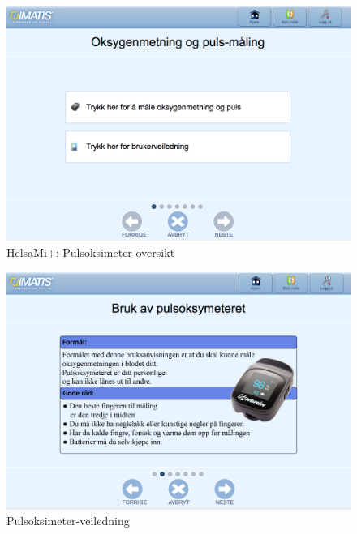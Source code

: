 \begin{figure}
\includegraphics[width=1.0\textwidth,center]{fig/helsami/pulsoksimeter_oversikt}
\caption{HelsaMi+: Pulsoksimeter-oversikt}
\label{fig:helsami_pulsoksimeter_oversikt}
\end{figure}

\begin{figure}
\includegraphics[width=1.0\textwidth,center]{fig/helsami/pulsoksimeter_veiledning}
\caption{Pulsoksimeter-veiledning}
\label{fig:helsami_pulsoksimeter_veiledning}
\end{figure}

